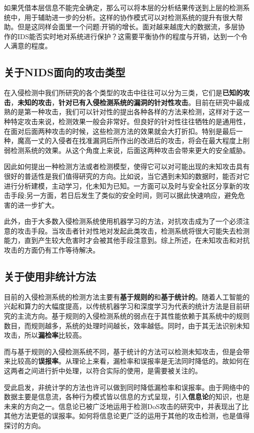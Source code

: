 \documentclass[12pt]{article} %
\begin{document}
如果凭借本层信息不能完全确定，那么可以将本层的分析结果传送到上层的检测系统中，用于辅助进一步的分析。这样的协作模式可以对检测系统的提升有很大帮助。但是这同样会面里一个问题:开销的增长。面对越来越庞大的数据流，多层协作的IDS能否实时地对系统进行保护？这需要平衡协作的程度与开销，达到一个令人满意的程度。
\subsection{关于NIDS面向的攻击类型}
\label{attack}

在入侵检测中我们所研究的各个类型的攻击中往往可以分为三类，它们是\textbf{已知的攻击}，\textbf{未知的攻击}，\textbf{针对已有入侵检测系统的漏洞的针对性攻击}。目前在研究中最成熟的是第一种攻击，我们可以针对性的提出各种各样的方法来检测，这样对于这一种特定攻击来说，检测效果一般会非常好。但良好的针对性往往牺牲的是通用性，在面对后面两种攻击的时候，这些检测方法的效果就会大打折扣。特别是最后一种，魔高一丈的入侵者在找准漏洞后所作出的改进后的攻击，将会在最大程度上削弱检测系统的效果。从这个角度上来说，后面这两种攻击会带来更大的安全威胁。

因此如何提出一种检测方法或者检测模型，使得它可以对可能出现的未知攻击具有很好的普适性是我们值得研究的方向。比如说，当它遇到未知的数据时，能否对它进行分析建模，主动学习，化未知为已知。一方面可以及时与安全社区分享新的攻击手段;另一方面，若日后发生了类似的安全时间，则可以据此快速响应，避免危害的进一步扩大。

此外，由于大多数入侵检测系统使用机器学习的方法，对抗攻击成为了一个必须注意的攻击手段。当攻击者针对性地对发起此类攻击，检测系统将很大可能失去检测能力，直到产生较大危害时才会被其他手段注意到。综上所述，在未知攻击和对抗攻击的方面仍有工作等待解决。
\subsection{关于使用非统计方法}
\label{nonprob}

目前的入侵检测系统的检测方法主要有\textbf{基于规则的}和\textbf{基于统计的}。随着人工智能的兴起和算力的大幅度提高，以传统机器学习和深度学习为代表的统计方法是目前研究的主流方向。基于规则的入侵检测系统的弱点在于其性能依赖于其系统中的规则数目，而规则越多，系统的处理时间越长，效率越低。同时，由于其无法识别未知攻击，所以\textbf{漏检率}比较高。

而与基于规则的入侵检测系统不同，基于统计的方法可以检测未知攻击，但是会带来比较高的\textbf{误报率}。从理论上来看，漏检率和误报率是无法同时降低的。故如何在这两者之间进行折中处理，以符合实际的使用，是需要被关注的。

受此启发，非统计学的方法也许可以做到同时降低漏检率和误报率。由于网络中的数据主要是信息流，各种行为模式皆以信息的方式呈现，引入\textbf{信息论}的知识，也是未来的方向之一。信息论已被广泛地运用于检测DoS攻击的研究中，并表现出了比其他方法更低的误报率。如何将信息论更广泛的运用于其他的攻击检测，也是值得探讨的方向。
\end{document}
